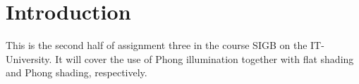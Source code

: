 \section{Introduction}

This is the second half of assignment three in the course SIGB on the
IT-University. It will cover the use of Phong illumination together with flat
shading and Phong shading, respectively.
